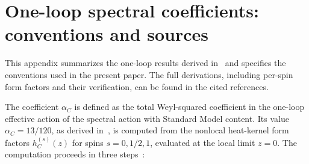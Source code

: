 \documentclass[12pt,a4paper]{article}
\theoremstyle{plain}
\theoremstyle{definition}
\theoremstyle{remark}
\begin{document}
\section{One-loop spectral coefficients: conventions and sources}
\label{app:alpha}

This appendix summarizes the one-loop results derived
in~\cite{Alfyorov:2026ff,Alfyorov:2026ct,Alfyorov:2026ss} and
specifies the conventions used in the present paper.  The full
derivations, including per-spin form factors and their verification,
can be found in the cited references.

The coefficient $\alpha_C$ is defined as the total Weyl-squared
coefficient in the one-loop effective action of the spectral action
with Standard Model content.  Its value $\alpha_C = 13/120$, as
derived in~\cite{Alfyorov:2026ff}, is
computed from the nonlocal heat-kernel form factors $h_C^{(s)}(z)$
for spins $s = 0, 1/2, 1$, evaluated at the local limit $z = 0$.
The computation proceeds in three
steps~\cite{Alfyorov:2026ff}:
\end{document}

